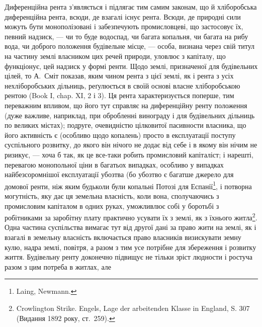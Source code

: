 Диференційна рента з’являється і підлягає тим самим законам, що й хліборобська
диференційна рента, всюди, де взагалі існує рента. Всюди, де природні
сили можуть бути монополізовані і забезпечують промисловцеві, що застосовує
їх, певний надзиск, — чи то буде водоспад, чи багата копальня, чи багата на
рибу вода, чи доброго положення будівельне місце, — особа, визнана через
свій титул на частину землі власником цих речей природи, уловлює з капіталу,
що функціонує, цей надзиск у формі ренти. Щодо землі, призначеної для будівельних
цілей, то А.~Сміт показав, яким чином рента з цієї землі, як і рента
з усіх нехліборобських дільниць, реґулюється в своїй основі власне хліборобською
рентою (Book I, chap. XI, 2 і 3). Ця рента характеризується поперше, тим
переважним впливом, що його тут справляє на диференційну ренту положення
(дуже важливе, наприклад, при обробленні винограду і для будівельних дільниць
по великих містах); подруге, очевидністю цілковитої пасивности власника, що його
активність є (особливо щодо копалень) просто в експлуатації поступу суспільного
розвитку, до якого він нічого не додає від себе і в якому він нічим не
ризикує, — хоча б так, як це все-таки робить промисловий капіталіст; і нарешті,
перевагою монопольної ціни в багатьох випадках, особливо у випадках
найбезсоромнішої експлуатації убозтва (бо убозтво є багатше джерело для
домової ренти, ніж яким будьколи були копальні Потозі для Еспанії\footnote{
Laing, Newmann.
},
і потворна могутність, яку дає ця земельна власність, коли вона, сполучаючись
з промисловим капіталом в одних руках, уможливлює собі у боротьбі з робітниками
за заробітну плату практично усувати їх з землі, як з їхнього
житла\footnote{
Crowlington Strike. Engels, Lage der arbeitenden Klasse in England, S. 307 (Видання
1892 року, ст.~259).
}. Одна частина суспільства вимагає тут від другої дані за право
жити на землі, як і взагалі в земельну власність включається право власників
визискувати земну кулю, надра землі, повітря, а разом з тим усе
потрібне для збереження і розвитку життя. Будівельну ренту доконечно підвищує
не тільки зріст людности і ростуча разом з цим потреба в житлах, але
\parbreak{}  %
